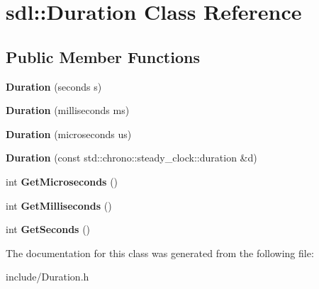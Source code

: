 \hypertarget{classsdl_1_1Duration}{\section{sdl\-:\-:Duration Class Reference}
\label{classsdl_1_1Duration}
}
\subsection*{Public Member Functions}
\begin{DoxyCompactItemize}
\item 
\hypertarget{classsdl_1_1Duration_a8a077183fa27b3b0a4c20434fbd34692}{{\bfseries Duration} (seconds s)}\label{classsdl_1_1Duration_a8a077183fa27b3b0a4c20434fbd34692}

\item 
\hypertarget{classsdl_1_1Duration_ac583c27457ca4aff6da873f973ae71d3}{{\bfseries Duration} (milliseconds ms)}\label{classsdl_1_1Duration_ac583c27457ca4aff6da873f973ae71d3}

\item 
\hypertarget{classsdl_1_1Duration_a538981014a1f872fa6f09fe508b2f12e}{{\bfseries Duration} (microseconds us)}\label{classsdl_1_1Duration_a538981014a1f872fa6f09fe508b2f12e}

\item 
\hypertarget{classsdl_1_1Duration_a969e01af2551271d92f8e91c9306be50}{{\bfseries Duration} (const std\-::chrono\-::steady\-\_\-clock\-::duration \&d)}\label{classsdl_1_1Duration_a969e01af2551271d92f8e91c9306be50}

\item 
\hypertarget{classsdl_1_1Duration_aa4b50bbf3792db9a6140e337134e7ffe}{int {\bfseries Get\-Microseconds} ()}\label{classsdl_1_1Duration_aa4b50bbf3792db9a6140e337134e7ffe}

\item 
\hypertarget{classsdl_1_1Duration_a2a9183964d1c3657b80b3325c8f5e33d}{int {\bfseries Get\-Milliseconds} ()}\label{classsdl_1_1Duration_a2a9183964d1c3657b80b3325c8f5e33d}

\item 
\hypertarget{classsdl_1_1Duration_a003277f2dfaa4075f1e46fa3b8430ace}{int {\bfseries Get\-Seconds} ()}\label{classsdl_1_1Duration_a003277f2dfaa4075f1e46fa3b8430ace}

\end{DoxyCompactItemize}


The documentation for this class was generated from the following file\-:\begin{DoxyCompactItemize}
\item 
include/Duration.\-h\end{DoxyCompactItemize}
